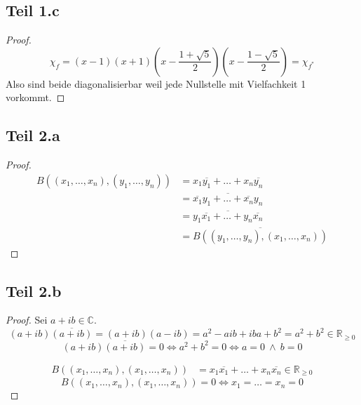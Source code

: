 \documentclass[10pt,a4paper]{article}
\begin{document}
\subsection*{Teil 1.c}

\begin{proof}
\begin{equation}
\chi_{f} = (x - 1)(x + 1)(x - \frac{1 + \sqrt{5}}{2})(x - \frac{1 - \sqrt{5}}{2}) = \chi_{f^{*}}
\end{equation}
Also sind beide diagonalisierbar weil jede Nullstelle mit Vielfachkeit 1 vorkommt.
\end{proof}

\subsection*{Teil 2.a}

\begin{proof}
\begin{align*}
B((x_{1}, \dots, x_{n}), (y_{1}, \dots, y_{n})) & = x_{1}\overline{y_{1}} + \dots + x_{n}\overline{y_{n}}\\
& = \overline{\overline{x_{1}}y_{1} + \dots + \overline{x_{n}}y_{n}}\\
& = \overline{y_{1}\overline{x_{1}} + \dots + y_{n}\overline{x_{n}}}\\
& = \overline{B((y_{1}, \dots, y_{n}), (x_{1}, \dots, x_{n}))}
\end{align*}
\end{proof}

\subsection*{Teil 2.b}

\begin{proof}
Sei $a + ib \in \mathbb{C}$.
\begin{equation}
(a + ib)\overline{(a + ib)} = (a + ib)(a - ib) = a^{2} - aib + iba + b^{2} = a^{2} + b^{2} \in \mathbb{R}_{\ge 0}
\end{equation}
\begin{equation}
(a + ib)\overline{(a + ib)} = 0 \Leftrightarrow a^{2} + b^{2} = 0 \Leftrightarrow a = 0\ \land\ b = 0
\end{equation}

\begin{align*}
B((x_{1}, \dots, x_{n}), (x_{1}, \dots, x_{n})) & = x_{1}\overline{x_{1}} + \dots + x_{n}\overline{x_{n}} \in \mathbb{R}_{\ge 0}
\end{align*}
\begin{equation}
B((x_{1}, \dots, x_{n}), (x_{1}, \dots, x_{n})) = 0 \Leftrightarrow x_{1} = \dots = x_{n} = 0
\end{equation}
\end{proof}
\end{document}
